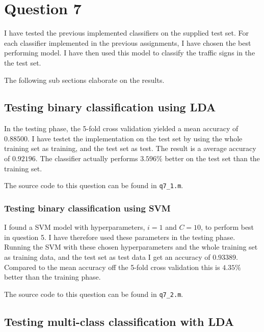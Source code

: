 \documentclass[10pt]{article}
\begin{document}


\section*{Question 7} %
\label{sec:question_7}
I have tested the previous implemented classifiers on the supplied test set. For each classifier implemented in the previous assignments, I have chosen the best performing model. I have then used this model to classify the traffic signs in the the test set.

The following sub sections elaborate on the results.

\subsection*{Testing binary classification using LDA} %
\label{sub:binary_classification}
In the testing phase, the 5-fold cross validation yielded a mean accuracy of $0.88500$. I have testet the implementation on the test set by using the whole training set as training, and the test set as test. The result is a average accuracy of $0.92196$. The classifier actually performs $3.596\%$ better on the test set than the training set. 

The source code to this question can be found in \texttt{q7\_1.m}.


\subsubsection*{Testing binary classification using SVM} %
\label{ssub:testing_binary_classification_using_svm}
I found a SVM model with hyperparameters, $i=1$ and $C=10$, to perform best in question 5. I have therefore used these parameters in the testing phase. Running the SVM with these chosen hyperparameters and the whole training set as training data, and the test set as test data I get an accuracy of $0.93389$. Compared to the mean accuracy off the 5-fold cross validation this is $4.35\%$ better than the training phase.

The source code to this question can be found in \texttt{q7\_2.m}.

\subsection*{Testing multi-class classification with LDA} %
\label{sub:multi_class_classification}
\end{document}

